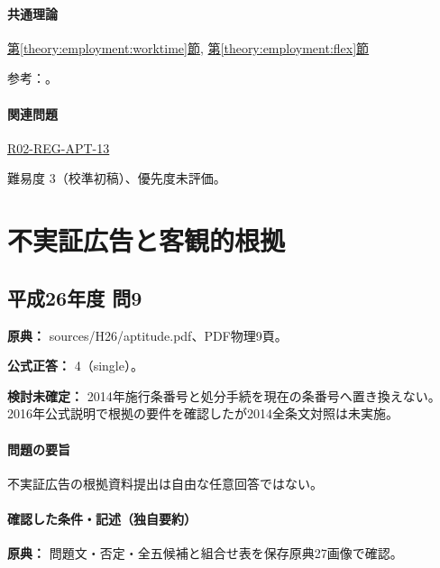 \paragraph{共通理論} \hyperref[theory:employment:worktime]{第\ref*{theory:employment:worktime}節}, \hyperref[theory:employment:flex]{第\ref*{theory:employment:flex}節}

\par 参考：\cite{employment_hours2017,employment_manager2008,employment_reform2018,employment_worklife2010}。

\paragraph{関連問題} \hyperref[q:r02-reg-apt-13]{R02-REG-APT-13}

\par 難易度 3（校準初稿）、優先度未評価。

\section{不実証広告と客観的根拠}

\subsection{平成26年度 問9}
\label{q:h26-reg-apt-09}

\noindent\textbf{原典：} sources/H26/aptitude.pdf、PDF物理9頁。

\textbf{公式正答：} 4（single）。

\par\textbf{検討未確定：} 2014年施行条番号と処分手続を現在の条番号へ置き換えない。2016年公式説明で根拠の要件を確認したが2014全条文対照は未実施。

\paragraph{問題の要旨} 不実証広告の根拠資料提出は自由な任意回答ではない。

\paragraph{確認した条件・記述（独自要約）}\mbox{}\par

\noindent\textbf{原典：} 問題文・否定・全五候補と組合せ表を保存原典27画像で確認。\par

